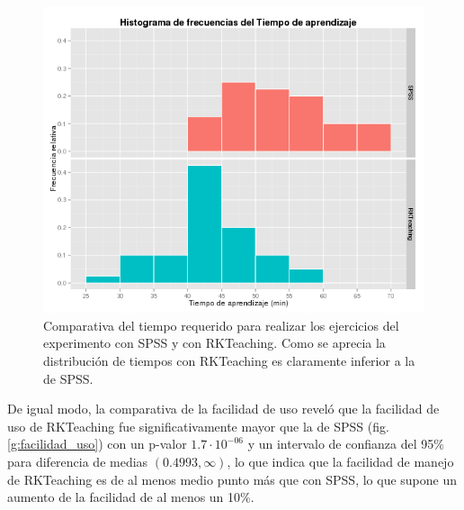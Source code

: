 \documentclass[10pt,twoside,spanish]{article}
\numberwithin{equation}{section}
\begin{document}
\begin{figure}[htp]
\begin{center}
  \includegraphics[width=\textwidth]{img/histograma_tiempo_aprendizaje.png}
  \caption{Comparativa del tiempo requerido para realizar los ejercicios del experimento con SPSS y con RKTeaching. Como se aprecia la
  distribución de tiempos con RKTeaching es claramente inferior a la de SPSS.}
  \label{g:tiempo_aprendizaje}
\end{center}
\end{figure}

De igual modo, la comparativa de la facilidad de uso reveló que la facilidad de uso de RKTeaching fue significativamente mayor que la de
SPSS (fig.\ref{g:facilidad_uso}) con un p-valor $1.7\cdot 10^{-06}$ y un intervalo de confianza del 95\% para diferencia de medias $(0.4993,
\infty)$, lo que indica que la facilidad de manejo de RKTeaching es de al menos medio punto más que con SPSS, lo que supone un aumento de la facilidad
de al menos un 10\%.
\end{document}
